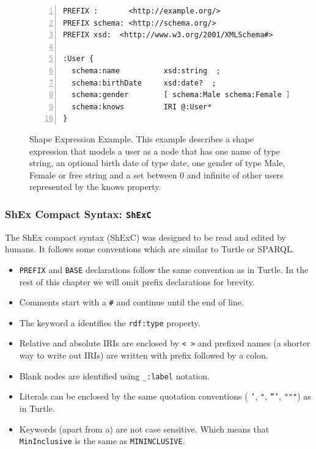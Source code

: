 \begin{figure}
\begin{lstlisting}[numbers=left, basicstyle=\ttfamily\scriptsize]
PREFIX :       <http://example.org/>
PREFIX schema: <http://schema.org/>
PREFIX xsd:  <http://www.w3.org/2001/XMLSchema#>

:User {
  schema:name          xsd:string  ;
  schema:birthDate     xsd:date?  ;
  schema:gender        [ schema:Male schema:Female ] OR xsd:string ;
  schema:knows         IRI @:User*
}
\end{lstlisting}
\caption[Shape Expression Example]{Shape Expression Example. This example describes a shape expression that
models a user as a node that has one name of type string, an optional birth date of type date, one gender
of type Male, Female or free string and a set between 0 and infinite of other users represented by the knows
property.}
\label{fig:shape-expr-ex}
\end{figure}

\subsubsection{ShEx Compact Syntax: \texttt{ShExC}}
The ShEx compact syntax (ShExC) was designed to be read and edited by humans. It follows some conventions which
are similar to Turtle or SPARQL.

\begin{itemize}
    \item \texttt{PREFIX} and \texttt{BASE} declarations follow the same convention as in Turtle. In the rest of
    this chapter we will omit prefix declarations for brevity.
	\item Comments start with a \texttt{\#} and continue until the end of line.
	\item The keyword a identifies the \texttt{rdf:type} property.
    \item Relative and absolute IRIs are enclosed by \texttt{< >} and prefixed names (a shorter way to write
    out IRIs) are written with prefix followed by a colon.
	\item Blank nodes are identified using \texttt{\_:label} notation.
    \item Literals can be enclosed by the same quotation conventions ( \texttt{'}, \texttt{"}, \texttt{'''},
    \texttt{"""}) as in Turtle.
    \item Keywords (apart from a) are not case sensitive. Which means that \texttt{MinInclusive} is the same
    as \texttt{MININCLUSIVE}.
\end{itemize}

